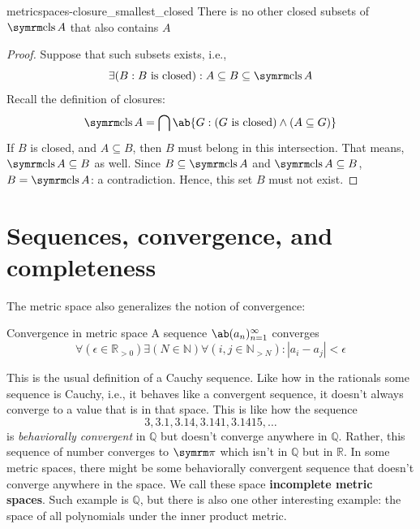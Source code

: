 \begin{prop}{}{metricspaces-closure_smallest_closed}
  There is no other closed subsets of \(\clos A\) that also contains \(A\)
\end{prop}

\begin{proof}
  Suppose that such subsets exists, i.e.,
  \begin{equation}
    \exists (B : B \textrm{ is closed}) : A \subseteq B \subseteq \clos A
  \end{equation}
  Recall the definition of closures:
  \begin{equation}
    \clos A = \bigcap \ab\{G : (G \textrm{ is closed}) \land (A \subseteq G)\}
  \end{equation}
  If \(B\) is closed, and \(A \subseteq B\), then \(B\) must belong in this intersection.
  That means, \(\clos A \subseteq B\) as well. Since \(B \subseteq \clos A\) and
  \(\clos A \subseteq B\), \(B = \clos A\): a contradiction. Hence, this set \(B\) must not exist.
\end{proof}

\section{Sequences, convergence, and completeness}

The metric space also generalizes the notion of convergence:
\begin{df}{Convergence in metric space}{}
  A sequence \(\sequence{a_n}{n = 1}{\infty}\) converges \ifft
  \begin{equation}
    \forall (\epsilon \in \mathbb{R}_{>0}) \exists (N \in \mathbb{N}) \forall (i, j \in \mathbb{N}_{>N}): |a_i - a_j| < \epsilon
  \end{equation}
\end{df}

This is the usual definition of a Cauchy sequence. Like how in the rationals some sequence
is Cauchy, i.e., it behaves like a convergent sequence, it doesn't always converge to
a value that is in that space. This is like how the sequence
\begin{equation}
  3, 3.1, 3.14, 3.141, 3.1415, \dots
\end{equation}
is \emph{behaviorally convergent} in \(\mathbb{Q}\) but doesn't converge anywhere in
\(\mathbb{Q}\). Rather, this sequence of number converges to \(\cpi\) which isn't in
\(\mathbb{Q}\) but in \(\mathbb{R}\). In some metric spaces, there might be some
behaviorally convergent sequence that doesn't converge anywhere in the space. We call
these space \textbf{incomplete metric spaces}. Such example is \(\mathbb{Q}\), but there
is also one other interesting example: the space of all polynomials under the inner product metric.


